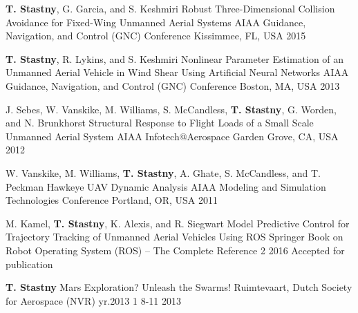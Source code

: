 \begin{cventries}
  \cvpubentry	
	{\textbf{T. Stastny}, G. Garcia, and S. Keshmiri} %
	{Robust Three-Dimensional Collision Avoidance for Fixed-Wing Unmanned Aerial Systems} %
	{AIAA Guidance, Navigation, and Control (GNC) Conference} %
	{} %
	{} %
	{} %
	{Kissimmee, FL, USA} %
	{2015} %
	{} %

  \cvpubentry	
	{\textbf{T. Stastny}, R. Lykins, and S. Keshmiri} %
	{Nonlinear Parameter Estimation of an Unmanned Aerial Vehicle in Wind Shear Using Artificial Neural Networks} %
	{AIAA Guidance, Navigation, and Control (GNC) Conference} %
	{} %
	{} %
	{} %
	{Boston, MA, USA} %
	{2013} %
	{} %
	
  \cvpubentry	
	{J. Sebes, W. Vanskike, M. Williams, S. McCandless, \textbf{T. Stastny}, G. Worden, and N. Brunkhorst} %
	{Structural Response to Flight Loads of a Small Scale Unmanned Aerial System} %
	{AIAA Infotech@Aerospace} %
	{} %
	{} %
	{} %
	{Garden Grove, CA, USA} %
	{2012} %
	{} %

  \cvpubentry	
	{W. Vanskike, M. Williams, \textbf{T. Stastny}, A. Ghate, S. McCandless, and T. Peckman} %
	{Hawkeye UAV Dynamic Analysis} %
	{AIAA Modeling and Simulation Technologies Conference} %
	{} %
	{} %
	{} %
	{Portland, OR, USA} %
	{2011} %
	{} %

\vspace{\acvSectionContentTopSkip}
\raggedright
{}
	
  \cvpubentry	
	{M. Kamel, \textbf{T. Stastny}, K. Alexis, and R. Siegwart} %
	{Model Predictive Control for Trajectory Tracking of Unmanned Aerial Vehicles Using ROS} %
	{Springer Book on Robot Operating System (ROS) -- The Complete Reference} %
	{2} %
	{} %
	{} %
	{} %
	{2016} %
	{Accepted for publication} %

\vspace{\acvSectionContentTopSkip}	
\raggedright
{}
	
  \cvpubentry	
	{\textbf{T. Stastny}} %
	{Mars Exploration? Unleash the Swarms!} %
	{Ruimtevaart, Dutch Society for Aerospace (NVR)} %
	{yr.2013} %
	{1} %
	{8-11} %
	{} %
	{2013} %
	{} %

\end{cventries}
